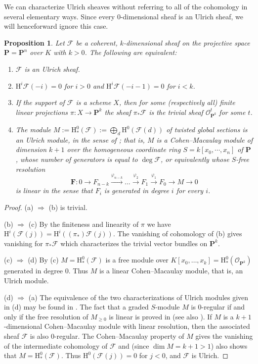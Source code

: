 \documentclass{jams-l}
\newtheorem{proposition}[theorem]{Proposition}
\theoremstyle{definition}
\theoremstyle{remark}
\newcommand{\F}{{\mathcal F}}
\newcommand{\FF}{{\mathbf F}}
\newcommand{\Hrm}{{\mathrm H}}
\newcommand{\Ocal}{{\mathcal O}}
\newcommand{\PP}{{\mathbf P}}
\newcommand{\rTo}{\xrightarrow}
\newcommand{\rTox}{\rightarrow}
\begin{document}
We can characterize Ulrich sheaves without referring to all of the cohomology
in several elementary ways. Since every 0-dimensional sheaf
is an Ulrich sheaf, we will henceforward ignore this case.

\begin{proposition}\label{Ulrich char} Let $\F$ be a coherent, 
$k$-dimensional
sheaf on the projective space $\PP=\PP^n$ over $K$ with $k>0$. The following
are equivalent:
\begin{enumerate}
\item[(a)] $\F$ is an Ulrich sheaf.
\item[(b)] $\Hrm^i \F(-i)=0$ for $i>0$ and $\Hrm^i \F(-i-1)=0$ for $i<k$. 
\item[(c)] If the support of $\F$ is a scheme $X$, then for 
some (respectively all) finite linear projections $\pi:X\to \PP^k$
the sheaf $\pi_*\F$ is the trivial sheaf $\Ocal_{\PP^k}^t$ for some $t$.  
\item[(d)] The
module $M:=\Hrm^0_*(\F):=\bigoplus_d \Hrm^0(\F(d))$ of twisted global sections 
is an {\it Ulrich module,\/} in the sense of 
\cite[1989]{Backelin and Herzog}; that is, $M$ is a
Cohen--Macaulay module of dimension $k+1$ over the homogeneous coordinate ring
$S=k[x_0,\cdots,x_n]$ of\/ $\PP$, whose number of generators is
equal to $\deg \F$, or equivalently whose $S$-free
resolution
\[ 
\FF: 0 \rTox F_{n-k} 
\rTo{\varphi_{n-k}} \ldots 
\rTo{\varphi_2}  F_1 
\rTo{\varphi_1}  F_0 
\rTox M \rTox 0
\]
is linear
in the sense that $F_i$ is generated in degree $i$ for every $i$.
\end{enumerate}
\end{proposition}

\begin{proof} (a) $\Rightarrow$ (b) is trivial.

\medbreak
(b) $\Rightarrow$ (c) By the finiteness and linearity of $\pi$
we have $\Hrm^i(\F(j))=\Hrm^i((\pi_*)\F(j))$.
The vanishing of cohomology of (b) gives vanishing for $\pi_* \F$ which
characterizes the trivial vector bundles on $\PP^k$.
 
\medbreak
(c) $\Rightarrow$ (d) By (c)  $M=\Hrm_*^0(\F)$ is a free
module over $K[x_0,\ldots,x_k]=\Hrm_*^0(\Ocal_{\PP^k})$ generated in degree 0.
Thus $M$ is a linear Cohen--Macaulay module, that is, an Ulrich
module.

\medbreak
(d) $\Rightarrow$ (a) The equivalence of the two
characterizations of Ulrich modules given in (d) may be found in
\cite[Prop.~1.5]{Brennanetal.1987}.
The fact that a graded $S$-module
$M$ is 0-regular if and only if 
the free resolution of $M_{\geq 0}$ is linear
is proved in \cite{Eisenbud and Goto 1984} 
(see also \cite[Theorem 20.18]{Eisenbud 1995}).
If $M$ is a $k+1$-dimensional Cohen--Macaulay module with
linear resolution, then the associated sheaf $\F$ is also 0-regular.
The Cohen--Macaulay property of $M$ gives the vanishing of the
intermediate cohomology of $\F$ and (since $\dim M = k+1 >1$)
also shows that
$M=\Hrm^0_*(\F)$. Thus $\Hrm^0(\F(j))=0$ for $j<0$, and $\F$ is Ulrich.
\end{proof}
\end{document}

